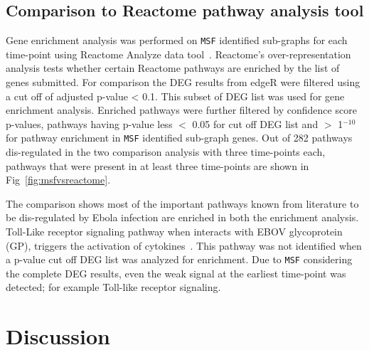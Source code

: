\documentclass[10pt,a4paper,twocolumn]{article}
\begin{document}
\subsection*{Comparison to Reactome pathway analysis tool}

  Gene enrichment analysis was performed on \texttt{MSF} identified sub-graphs for each time-point using Reactome Analyze data tool~\cite{Reactome}. Reactome's over-representation analysis tests whether certain Reactome pathways are enriched by the list of genes submitted. For comparison the DEG results from edgeR were filtered using a cut off of adjusted p-value < 0.1. This subset of DEG list was used for gene enrichment analysis. Enriched pathways were further filtered by confidence score p-values, pathways having p-value less $<$ 0.05 for cut off DEG list and $>$ 1$^{-10}$ for  pathway enrichment in \texttt{MSF} identified sub-graph genes. Out of 282 pathways dis-regulated in the two comparison analysis with three time-points each, pathways that were present in at least three time-points are shown in Fig~\ref{fig:msfvsreactome}.
  
  The comparison shows most of the important pathways known from literature to be dis-regulated by Ebola infection are enriched in both the enrichment analysis. Toll-Like receptor signaling pathway when interacts with EBOV glycoprotein (GP), triggers the activation of cytokines~\cite{Olejnik}. This pathway was not identified when a p-value cut off DEG list was analyzed for enrichment. Due to \texttt{MSF} considering the complete DEG results, even the weak signal at the earliest time-point was detected; for example Toll-like receptor signaling.



\section*{Discussion}
\end{document}
